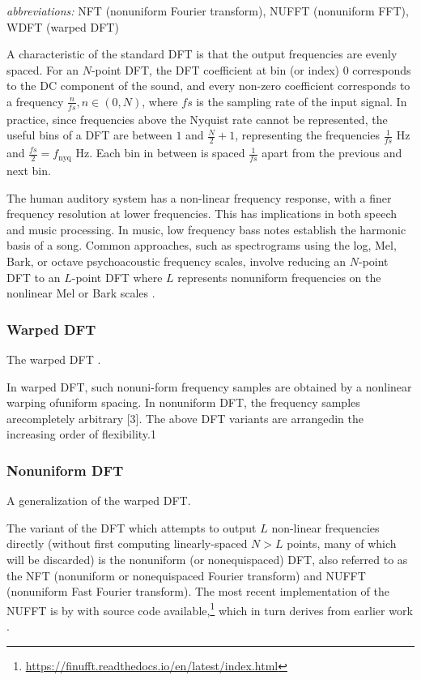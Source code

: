 \documentclass[letter,12pt]{article}
\begin{document}
\qquad \textit{abbreviations:} NFT (nonuniform Fourier transform), NUFFT (nonuniform FFT), WDFT (warped DFT)

A characteristic of the standard DFT is that the output frequencies are evenly spaced. For an $N$-point DFT, the DFT coefficient at bin (or index) 0 corresponds to the DC component of the sound, and every non-zero coefficient corresponds to a frequency $\frac{n}{\mathit{fs}}, n \in (0, N)$, where $\mathit{fs}$ is the sampling rate of the input signal. In practice, since frequencies above the Nyquist rate cannot be represented, the useful bins of a DFT are between $1$ and $\frac{N}{2}+1$, representing the frequencies $\frac{1}{\mathit{fs}}$ Hz and $\frac{\mathit{fs}}{2} = f_{\text{nyq}}$ Hz. Each bin in between is spaced $\frac{1}{\mathit{fs}}$ apart from the previous and next bin.

The human auditory system has a non-linear frequency response, with a finer frequency resolution at lower frequencies.  This has implications in both speech and music processing. In music, low frequency bass notes establish the harmonic basis of a song.  Common approaches, such as spectrograms using the log, Mel, Bark, or octave psychoacoustic frequency scales, involve reducing an $N$-point DFT to an $L$-point DFT where $L$ represents nonuniform frequencies on the nonlinear Mel or Bark scales .


\subsubsection{Warped DFT}

The warped DFT \cite{warped1, warped2}.

 In warped DFT, such nonuni-form frequency samples are obtained by a nonlinear warping ofuniform spacing. In nonuniform DFT, the frequency samples arecompletely arbitrary [3]. The above DFT variants are arrangedin the increasing order of flexibility.1


\subsubsection{Nonuniform DFT}

A generalization of the warped DFT.

The variant of the DFT which attempts to output $L$ non-linear frequencies directly (without first computing linearly-spaced $N > L$ points, many of which will be discarded) is the nonuniform (or nonequispaced) DFT, also referred to as the NFT (nonuniform or nonequispaced Fourier transform) and NUFFT (nonuniform Fast Fourier transform). The most recent implementation of the NUFFT is by \citet{nufft1} with source code available,\footnote{\href{https://finufft.readthedocs.io/en/latest/index.html}{https://finufft.readthedocs.io/en/latest/index.html}} which in turn derives from earlier work \cite{nufft2, nufft3}.
\end{document}
